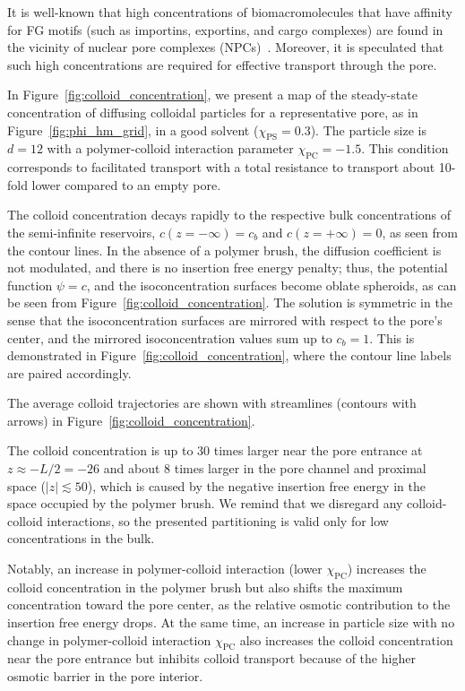\documentclass[12pt, a4paper]{article}
\newcommand\todo[1]{\textcolor{red}{#1}}
\begin{document}
It is well-known that high concentrations of biomacromolecules that have affinity for FG motifs (such as importins, exportins, and cargo complexes) are found in the vicinity of nuclear pore complexes (NPCs)~\cite{Beck2007, Gruenwald2010, Tu2011}.%
Moreover, it is speculated that such high concentrations are required for effective transport through the pore.%

In Figure~\ref{fig:colloid_concentration}, we present a map of the steady-state concentration of diffusing colloidal particles for a representative pore, as in Figure~\ref{fig:phi_hm_grid}, in a good solvent ($\chi_{\textrm{PS}} = 0.3$).
The particle size is $d = 12$ with a polymer-colloid interaction parameter $\chi_{\textrm{PC}} = -1.5$.
This condition corresponds to facilitated transport with a total resistance to transport about 10-fold lower compared to an empty pore.

The colloid concentration decays rapidly to the respective bulk concentrations of the semi-infinite reservoirs, $c(z = -\infty) = c_{b}$ and $c(z = +\infty) = 0$, as seen from the contour lines.
In the absence of a polymer brush, the diffusion coefficient is not modulated, and there is no insertion free energy penalty; thus, the potential function $\psi = c$, and the isoconcentration surfaces become oblate spheroids, as can be seen from Figure~\ref{fig:colloid_concentration}.
The solution is symmetric in the sense that the isoconcentration surfaces are mirrored with respect to the pore's center, and the mirrored isoconcentration values sum up to $c_{b} = 1$.
This is demonstrated in Figure~\ref{fig:colloid_concentration}, where the contour line labels are paired accordingly.

The average colloid trajectories are shown with streamlines (contours with arrows) in Figure~\ref{fig:colloid_concentration}.

The colloid concentration is up to 30 times larger near the pore entrance at $z \approx -L/2 = -26$ and about 8 times larger in the pore channel and proximal space ($|z| \lesssim 50$), which is caused by the negative insertion free energy in the space occupied by the polymer brush.
We remind that we disregard any colloid-colloid interactions, so the presented partitioning is valid only for low concentrations in the bulk.

Notably, an increase in polymer-colloid interaction (lower $\chi_{\textrm{PC}}$) increases the colloid concentration in the polymer brush but also shifts the maximum concentration toward the pore center, as the relative osmotic contribution to the insertion free energy drops.
At the same time, an increase in particle size with no change in polymer-colloid interaction $\chi_{\textrm{PC}}$ also increases the colloid concentration near the pore entrance but inhibits colloid transport because of the higher osmotic barrier in the pore interior.
\end{document}
